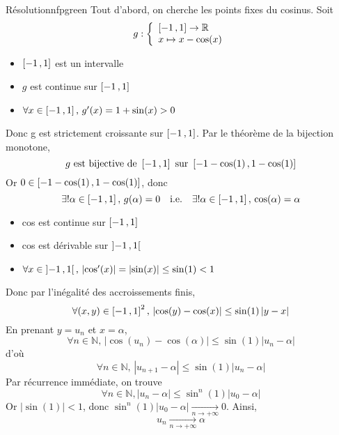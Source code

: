     \begin{omed}{Résolution}{nfpgreen}
    Tout d’abord, on cherche les points fixes du cosinus. Soit 
    \[ g : \left\{ \begin{array}{l}
    \left[ -1 \, , 1 \right] \rightarrow \mathbb{R} \\
    x \mapsto x - \cos(x) \end{array} \right. \]
    \begin{itemize}[label=$\diamond$]
        \item $ \left[ -1 \, , 1 \right]$ est un intervalle
        \item $g$ est continue sur $ \left[ -1 \, , 1 \right]$
        \item $\forall x \in  \left[ -1 \, , 1 \right], \, g'(x) = 1 + \sin(x) > 0$
    \end{itemize}
    Donc g est strictement croissante sur $ \left[ -1 \, , 1 \right]$. Par le théorème de la bijection monotone, 
    \[ g \text{ est bijective de } \left[ -1 \, , 1 \right] \text{ sur } \left[ -1 - \cos(1) \, , 1 - \cos(1) \right] \]
    Or $0 \in \left[ -1 - \cos(1) \, , 1 - \cos(1) \right]$, donc 
    \[ \exists! \alpha \in  \left[ -1 \, , 1 \right], \, g(\alpha) = 0 \quad \text{i.e.} \quad \exists ! \alpha \in  \left[ -1 \, , 1 \right], \, \cos(\alpha) = \alpha \]
    \begin{itemize}[label=$\diamond$]
    \item cos est continue sur $ \left[ -1 \, , 1 \right]$
    \item cos est dérivable sur $ \left] -1 \, , 1 \right[$
    \item $\forall x \in \left] -1 \, , 1 \right[, \, \left| \cos'(x) \right| = \left| \sin(x) \right| \leq \sin(1) < 1$
    \end{itemize} 
    Donc par l’inégalité des accroissements finis, 
    \[ \forall (x,y) \in \left[ -1 \, , 1 \right]^2, \, \left| \cos(y) - \cos(x) \right| \leq \sin(1) \left| y-x \right| \]
    En prenant $y = u_n$ et $x = \alpha$,
    \[ \forall n \in \mathbb{N}, \,  \left| \cos(u_n) - \cos(\alpha) \right| \leq \sin(1) \left| u_n-\alpha \right| \]
    d’où
    \[ \forall n \in \mathbb{N}, \, \left| u_{n+1} - \alpha \right| \leq \sin(1) \left| u_n-\alpha \right| \]
    Par récurrence immédiate, on trouve 
    \[ \forall n \in \mathbb{N}, \left| u_{n} - \alpha \right| \leq \sin^n(1) \left| u_0-\alpha \right|\]
    Or $\left| \sin(1) \right| < 1$, donc $ \sin^n(1) \left| u_0 - \alpha\right| \underset{n \rightarrow +\infty}{\longrightarrow} 0$.  Ainsi, 
    \[ u_n \underset{n \rightarrow +\infty}{\longrightarrow} \alpha \]
    \end{omed}

